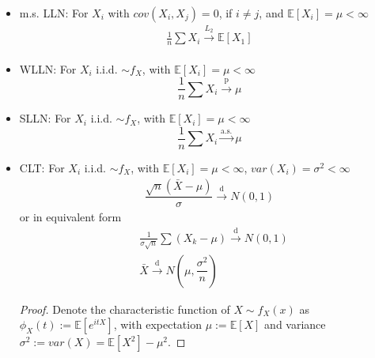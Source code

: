 \begin{itemize}
\item m.s. LLN: For $ X_i $ with $ cov(X_i,X_j)=0$, if $ i\neq j $, and $ \mathbb{E}\left[ X_i \right] =\mu <\infty $
\begin{align}
    \frac{1}{n}\sum X_i\xrightarrow[]{L_2} \mathbb{E}\left[ X_1 \right]
\end{align}


\item WLLN: For $ X_i $ i.i.d. $ \sim f_X $, with $ \mathbb{E}\left[ X_i \right]=\mu <\infty $
\begin{equation}\label{EqaWLLN}    \frac{1}{n}\sum X_i\xrightarrow[]{\mathrm{p}}\mu 
\end{equation}
\item SLLN: For $ X_i $ i.i.d. $ \sim f_X $, with $ \mathbb{E}\left[ X_i \right] =\mu <\infty $
\begin{equation}    \frac{1}{n}\sum X_i\xrightarrow[]{\text{a.s.}}  \mu 
\end{equation}
\item CLT: For $ X_i $ i.i.d. $ \sim f_X $, with $ \mathbb{E}\left[ X_i \right] =\mu <\infty $, $ var(X_i)=\sigma ^2<\infty $
\begin{align}
     \dfrac{\sqrt{n}\left(\bar{X}-\mu \right)}{\sigma }\xrightarrow[]{\mathrm{d}} N(0,1)
\end{align}
or in equivalent form
\begin{align}    
    &\frac{1}{\sigma\sqrt{n}}\sum(X_k-\mu)\xrightarrow[]{\mathrm{d}} N(0,1)\\
    &\bar{X}\xrightarrow[]{\mathrm{d}} N(\mu ,\dfrac{\sigma ^2}{n})
\end{align}

\begin{proof}
    Denote the characteristic function of $ X\sim f_X(x) $ as $ \phi _X(t):=\mathbb{E}\left[ e^{itX} \right] $, with expectation $ \mu :=\mathbb{E}\left[ X \right]  $ and variance $ \sigma^2:=var(X)=\mathbb{E}\left[ X^2\right] -\mu  ^2 $.
    

\end{proof}
\end{itemize}
